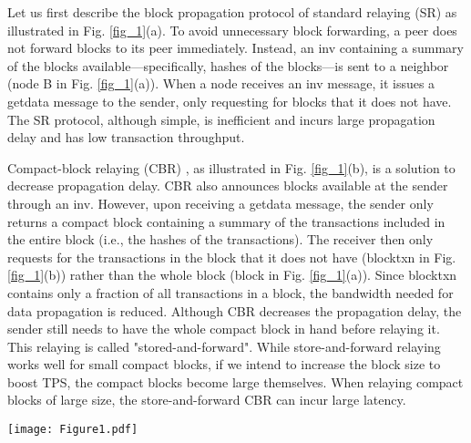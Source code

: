 \documentclass[10pt,journal,compsoc]{IEEEtran}
\begin{document}
Let us first describe the block propagation protocol of standard relaying (SR) as illustrated in Fig. \ref{fig_1}(a). To avoid unnecessary block forwarding, a peer does not forward blocks to its peer immediately. Instead, an inv \cite{decker2013information} containing a summary of the blocks available—specifically, hashes of the blocks—is sent to a neighbor (node B in Fig. \ref{fig_1}(a)). When a node receives an inv message, it issues a getdata message to the sender, only requesting for blocks that it does not have. The SR protocol, although simple, is inefficient and incurs large propagation delay and has low transaction throughput.

Compact-block relaying (CBR) \cite{corallo2017compact}, as illustrated in Fig. \ref{fig_1}(b), is a solution to decrease propagation delay. CBR also announces blocks available at the sender through an inv. However, upon receiving a getdata message, the sender only returns a compact block containing a summary of the transactions included in the entire block (i.e., the hashes of the transactions). The receiver then only requests for the transactions in the block that it does not have (blocktxn in Fig. \ref{fig_1}(b)) rather than the whole block (block in Fig. \ref{fig_1}(a)). Since blocktxn contains only a fraction of all transactions in a block, the bandwidth needed for data propagation is reduced. Although CBR decreases the propagation delay, the sender still needs to have the whole compact block in hand before relaying it. This relaying is called "stored-and-forward". While store-and-forward relaying works well for small compact blocks, if we intend to increase the block size to boost TPS, the compact blocks become large themselves. When relaying compact blocks of large size, the store-and-forward CBR can incur large latency. 

%
%
\begin{figure*}[!t]
\centering
\texttt{[image: Figure1.pdf]}
\caption{The forwarding of a block over two hops by three different block propagation protocols: (a) the original block propagation protocol; (b) the compact block relaying protocol; (c) the cut-through compact block relaying.}
\label{fig_1}
\end{figure*}
\end{document}
